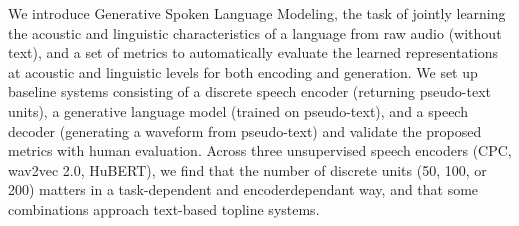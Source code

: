 We introduce Generative Spoken Language Modeling, the task of jointly learning the acoustic and linguistic characteristics of a language from raw audio (without text), and a set of metrics to automatically evaluate the learned representations at acoustic and linguistic levels for both encoding and generation. We set up baseline systems consisting of a discrete speech encoder (returning pseudo-text units), a generative language model (trained on pseudo-text), and a speech decoder (generating a waveform from pseudo-text) and validate the proposed metrics with human evaluation. Across three unsupervised speech encoders (CPC, wav2vec 2.0, HuBERT), we find that the number of discrete units (50, 100, or 200) matters in a task-dependent and encoderdependant way, and that some combinations approach text-based topline systems.
